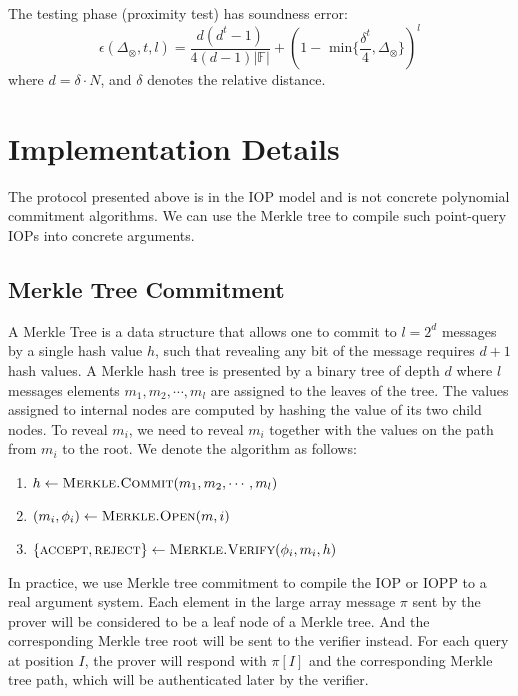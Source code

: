\begin{lemma}
\label{lemma:pc-soundness}
The testing phase (proximity test) has soundness error:
$$
    \epsilon(\Delta_\otimes, t, l) = \frac{d(d^t-1)}{4(d-1)|\mathbb{F}|} + (1 - \text{ min}\{\frac{\delta^t}{4}, \Delta_\otimes \})^l
$$
where $d = \delta \cdot N$, and $\delta$ denotes the relative distance.
\end{lemma}


\section{Implementation Details}

The protocol presented above is in the IOP model and is not concrete polynomial commitment algorithms. We can use the Merkle tree to compile such point-query IOPs into concrete arguments.

\subsection{Merkle Tree Commitment}

A Merkle Tree is a data structure that allows one to commit to $l = 2^{d}$ messages by a single hash value $h$, such that revealing any bit of the message requires $d+1$ hash values. A Merkle hash tree is presented by a binary tree of depth $d$ where $l$ messages elements $m_1, m_2, \cdots, m_l$ are assigned to the leaves of the tree. The values assigned to internal nodes are computed by hashing the value of its two child nodes. To reveal $m_i$, we need to reveal $m_i$ together with the values on the path from $m_i$ to the root. We denote the algorithm as follows:

\begin{enumerate}
    \item $h \leftarrow \textsc{Merkle.Commit}(m_1, m_2, \cdots, m_l)$
    \item $(m_i, \phi_i) \leftarrow \textsc{Merkle.Open}(m, i)$
    \item $\{\textsc{accept}, \textsc{reject}\} \leftarrow \textsc{Merkle.Verify}(\phi_i, m_i, h)$
\end{enumerate}

In practice, we use Merkle tree commitment to compile the IOP or IOPP to a real argument system. Each element in the large array message $\pi$ sent by the prover will be considered to be a leaf node of a Merkle tree. And the corresponding Merkle tree root will be sent to the verifier instead. For each query at position $I$, the prover will respond with $\pi[I]$ and the corresponding Merkle tree path, which will be authenticated later by the verifier.

